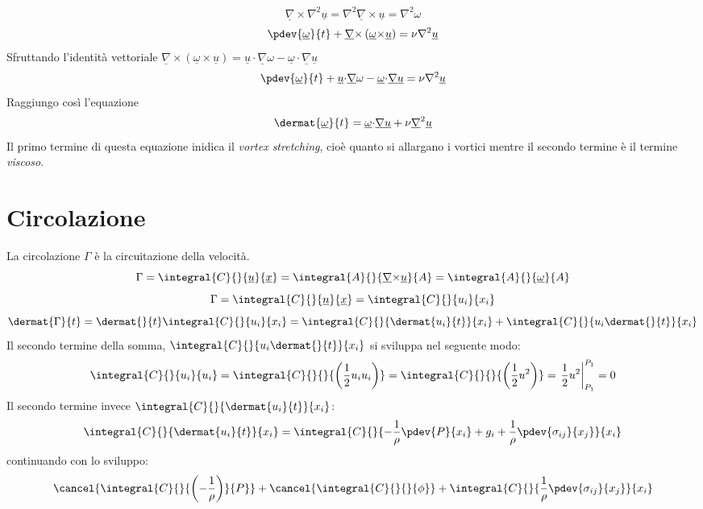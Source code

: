  \[
   \underline{\nabla}{\times}{\nabla}^2 \underline{u} = {\nabla}^2 \underline{\nabla}{\times}\underline{u}= {\nabla}^2 {\omega}
 \]
 \[
	 \pdev{\underline{{\omega}}}{t} + \underline{\nabla}{\times} \left( \underline{{\omega}} {\times}\underline{u} \right) = {\nu}{\nabla}^2 \underline{u}
 \]
 Sfruttando l'identità vettoriale $ \underline{\nabla}{\times}\left( {\underline{\omega}}{\times} \underline{u} \right) = \underline{u}{\cdot}\underline{\nabla}{\omega}-{\underline{\omega}}{\cdot}\underline{\nabla}\underline{u} $
 \[
	 \pdev{\underline{{\omega}}}{t} + \underline{u}{\cdot}\underline{\nabla}{\omega}- \underline{{\omega}}{\cdot}\underline{\nabla}\underline{u}= {\nu}{\nabla}^2 \underline{u}
 \]
 Raggiungo così l'equazione
 \begin{equation}
   \dermat{\underline{{\omega}}}{t} = \underline{{\omega}} {\cdot} \underline{\nabla}\underline{u}+ {\nu}\underline{\nabla}^2 \underline{u}
 \end{equation}
 Il primo termine di questa equazione inidica il \emph{vortex stretching}, cioè quanto si allargano i vortici mentre il secondo termine è il termine \emph{viscoso}.

\section{Circolazione}
La circolazione $ {\Gamma} $ è la circuitazione della velocità.
\[
  {\Gamma} ={ \integral{C}{}{\underline{u}}{\underline{x}}  }  = { \integral{A}{}{\underline{\nabla}{\times}\underline{u}}{A}  } = \integral{A}{}{\underline{{\omega}}}{A}
\]
\[
  {\Gamma} = \integral{C}{}{\underline{n}}{\underline{x}} = \integral{C}{}{{u_i}}{{x_i}}
\]
\[
  \dermat{{\Gamma}}{t} = \dermat{}{t} \integral{C}{}{{u_i}}{{x_i}} = \integral{C}{}{\dermat{{u_i}}{t}}{{x_i}} + \integral{C}{}{{u_i \dermat{}{t}}}{{x_i}}
\]
Il secondo termine della somma, $ \integral{C}{}{{u_i \dermat{}{t}}}{{x_i}} $ si sviluppa nel seguente modo:
\[
	\integral{C}{}{{u_i}}{{u_i}} = \integral{C}{}{}{\left( \frac{1}{2} {u_i}{u_i} \right)} = \integral{C}{}{}{\left( \frac{1}{2} u ^2 \right)} = \left.  \frac{1}{2} u ^2\right|_{P_1}^{P_1} = 0 
\]
Il secondo termine invece $ \integral{C}{}{\dermat{{u_i}}{t}}{{x_i}} $:
\[
	\integral{C}{}{\dermat{{u_i}}{t}}{{x_i}} = \integral{C}{}{-\frac{1}{{\rho}}\pdev{P}{{x_i}}+g_i+\frac{1}{{\rho}}\pdev{\sigma_{ij}}{{x_j}}}{{x_i}}
\]
continuando con lo sviluppo:
\[
	\cancel{\integral{C}{}{\left( - \frac{1}{{\rho}} \right)}{P}} + \cancel{\integral{C}{}{}{{\phi}}} + \integral{C}{}{\frac{1}{{\rho}} \pdev{\sigma_{ij}}{{x_j}}}{{x_i}} 
\]
